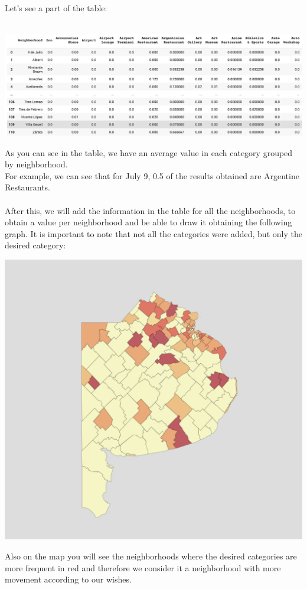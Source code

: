 \documentclass[12pt,a4paper]{tesis}
\begin{document}
Let's see a part of the table: \\ \\

\centerline{
	\includegraphics[scale=0.4]{tabla2}
}
As you can see in the table, we have an average value in each category grouped by neighborhood. \\
For example, we can see that for July 9, 0.5 of the results obtained are Argentine Restaurants. \\
\\
After this, we will add the information in the table for all the neighborhoods, to obtain a value per neighborhood and be able to draw it obtaining the following graph. It is important to note that not all the categories were added, but only the desired category:

\centerline{
	\includegraphics[scale=0.8]{mapa4}
}

Also on the map you will see the neighborhoods where the desired categories are more frequent in red and therefore we consider it a neighborhood with more movement according to our wishes. \\
\end{document}
